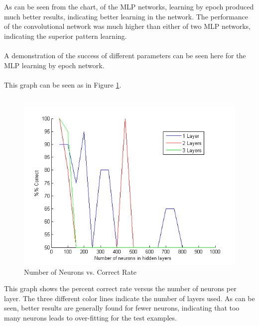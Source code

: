 \documentclass[12pt,twoside]{article} %
\begin{document}
  As can be seen from the chart, of the MLP networks, learning by epoch produced much better results, indicating better learning in the network. The performance of the convolutional network was much higher than either of two MLP networks, indicating the superior pattern learning.
  \\\\
  A demonstration of the success of different parameters can be seen here for the MLP learning by epoch network.
  \\\\
This graph can be seen as in Figure \ref{fig:num_neurons}.
\\\\
\begin{figure}
	\hspace*{-.1cm}\includegraphics[scale=0.9]{num_neurons_for_learning}
	\caption{Number of Neurons vs. Correct Rate}
	\label{fig:num_neurons}
\end{figure}
  This graph shows the percent correct rate versus the number of neurons per layer. The three different color lines indicate the number of layers used. As can be seen, better results are generally found for fewer neurons, indicating that too many neurons leads to over-fitting for the test examples.
  
\end{document}
